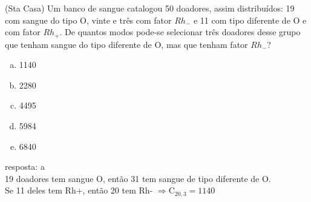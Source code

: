 \begin{ex}
 (Sta Casa) Um banco de sangue catalogou 50 doadores, assim distribuídos: 19 com sangue do tipo O, vinte e três  com fator $Rh_-$ e 11 com tipo diferente de O e com fator $Rh_+$. De quantos modos pode-se selecionar três doadores desse grupo que tenham sangue do tipo diferente de O, mas que tenham fator $Rh_-$? 
    \begin{enumerate}[(a)]
    \item 1140
    \item 2280
    \item 4495
    \item 5984
    \item 6840
    \end{enumerate}
       \begin{sol}
        resposta: a \\
        19 doadores tem sangue O, então 31 tem sangue de tipo diferente de O.\\ Se 11 deles tem Rh+, então 20 tem Rh-
        $\Longrightarrow \mathrm{C}_{{20},3}=1140$
       \end{sol}
\end{ex}